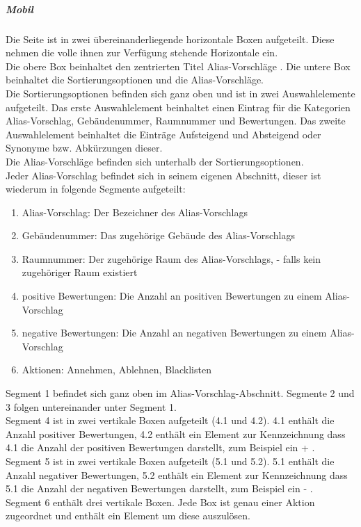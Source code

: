 \subparagraph*{Mobil}
Die Seite ist in zwei übereinanderliegende horizontale Boxen aufgeteilt. Diese nehmen die volle ihnen zur Verfügung stehende Horizontale ein.\\
Die obere Box beinhaltet den zentrierten Titel \dq Alias-Vorschläge \dq.
Die untere Box beinhaltet die Sortierungsoptionen und die Alias-Vorschläge.\\
Die Sortierungsoptionen befinden sich ganz oben und ist in zwei Auswahlelemente aufgeteilt. 
Das erste Auswahlelement beinhaltet einen Eintrag für die Kategorien Alias-Vorschlag, Gebäudenummer, Raumnummer und Bewertungen.
Das zweite Auswahlelement beinhaltet die Einträge \dq Aufsteigend \dq{} und \dq Absteigend \dq{} oder Synonyme bzw. Abkürzungen dieser.\\
Die Alias-Vorschläge befinden sich unterhalb der Sortierungsoptionen.\\
Jeder Alias-Vorschlag befindet sich in seinem eigenen Abschnitt, dieser ist wiederum in folgende Segmente aufgeteilt:

\begin{enumerate}
    \item Alias-Vorschlag: Der Bezeichner des Alias-Vorschlags
    \item Gebäudenummer: Das zugehörige Gebäude des Alias-Vorschlags
    \item Raumnummer: Der zugehörige Raum des Alias-Vorschlags, \dq - \dq{} falls kein zugehöriger Raum existiert
    \item positive Bewertungen: Die Anzahl an positiven Bewertungen zu einem Alias-Vorschlag
    \item negative Bewertungen: Die Anzahl an negativen Bewertungen zu einem Alias-Vorschlag
    \item Aktionen: Annehmen, Ablehnen, Blacklisten
\end{enumerate}

\begin{minipage}{.5\textwidth}
    Segment 1 befindet sich ganz oben im Alias-Vorschlag-Abschnitt. Segmente 2 und 3 folgen untereinander unter Segment 1. \\
    Segment 4 ist in  zwei vertikale Boxen aufgeteilt (4.1 und 4.2).
    4.1 enthält die Anzahl positiver Bewertungen, 4.2 enthält ein Element zur Kennzeichnung dass 4.1 die Anzahl der positiven Bewertungen darstellt, zum Beispiel ein \dq + \dq. \\
    Segment 5 ist in  zwei vertikale Boxen aufgeteilt (5.1 und 5.2). 
    5.1 enthält die Anzahl negativer Bewertungen, 5.2 enthält ein Element zur Kennzeichnung dass 5.1 die Anzahl der negativen Bewertungen darstellt, zum Beispiel ein \dq - \dq. \\
    Segment 6 enthält drei vertikale Boxen. Jede Box ist genau einer Aktion zugeordnet und enthält ein Element um diese auszulösen.
\end{minipage}

